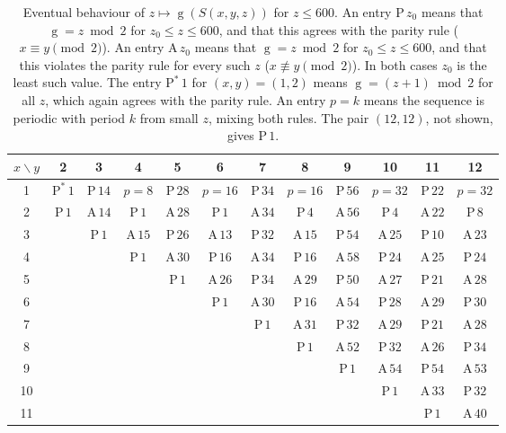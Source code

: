 \documentclass[11pt]{amsart}
\theoremstyle{definition}
\theoremstyle{remark}
\newcommand{\gv}{\operatorname{g}}           %
\newcommand{\Sp}{S}
\begin{document}
\begin{table}[t]
\centering
\footnotesize
\setlength{\tabcolsep}{3.2pt}
\begin{tabular}{c|ccccccccccc}
\toprule
$x\backslash y$ & 2 & 3 & 4 & 5 & 6 & 7 & 8 & 9 & 10 & 11 & 12\\
\midrule
1 & $\mathrm{P}^{*}\,1$ & $\mathrm{P}\,14$ & $p{=}8$ & $\mathrm{P}\,28$ & $p{=}16$ & $\mathrm{P}\,34$ & $p{=}16$ & $\mathrm{P}\,56$ & $p{=}32$ & $\mathrm{P}\,22$ & $p{=}32$\\
2 & $\mathrm{P}\,1$ & $\mathrm{A}\,14$ & $\mathrm{P}\,1$ & $\mathrm{A}\,28$ & $\mathrm{P}\,1$ & $\mathrm{A}\,34$ & $\mathrm{P}\,4$ & $\mathrm{A}\,56$ & $\mathrm{P}\,4$ & $\mathrm{A}\,22$ & $\mathrm{P}\,8$\\
3 &  & $\mathrm{P}\,1$ & $\mathrm{A}\,15$ & $\mathrm{P}\,26$ & $\mathrm{A}\,13$ & $\mathrm{P}\,32$ & $\mathrm{A}\,15$ & $\mathrm{P}\,54$ & $\mathrm{A}\,25$ & $\mathrm{P}\,10$ & $\mathrm{A}\,23$\\
4 &  &  & $\mathrm{P}\,1$ & $\mathrm{A}\,30$ & $\mathrm{P}\,16$ & $\mathrm{A}\,34$ & $\mathrm{P}\,16$ & $\mathrm{A}\,58$ & $\mathrm{P}\,24$ & $\mathrm{A}\,25$ & $\mathrm{P}\,24$\\
5 &  &  &  & $\mathrm{P}\,1$ & $\mathrm{A}\,26$ & $\mathrm{P}\,34$ & $\mathrm{A}\,29$ & $\mathrm{P}\,50$ & $\mathrm{A}\,27$ & $\mathrm{P}\,21$ & $\mathrm{A}\,28$\\
6 &  &  &  &  & $\mathrm{P}\,1$ & $\mathrm{A}\,30$ & $\mathrm{P}\,16$ & $\mathrm{A}\,54$ & $\mathrm{P}\,28$ & $\mathrm{A}\,29$ & $\mathrm{P}\,30$\\
7 &  &  &  &  &  & $\mathrm{P}\,1$ & $\mathrm{A}\,31$ & $\mathrm{P}\,32$ & $\mathrm{A}\,29$ & $\mathrm{P}\,21$ & $\mathrm{A}\,28$\\
8 &  &  &  &  &  &  & $\mathrm{P}\,1$ & $\mathrm{A}\,52$ & $\mathrm{P}\,32$ & $\mathrm{A}\,26$ & $\mathrm{P}\,34$\\
9 &  &  &  &  &  &  &  & $\mathrm{P}\,1$ & $\mathrm{A}\,54$ & $\mathrm{P}\,54$ & $\mathrm{A}\,53$\\
10 &  &  &  &  &  &  &  &  & $\mathrm{P}\,1$ & $\mathrm{A}\,33$ & $\mathrm{P}\,32$\\
11 &  &  &  &  &  &  &  &  &  & $\mathrm{P}\,1$ & $\mathrm{A}\,40$\\
\bottomrule
\end{tabular}
\caption{Eventual behaviour of $z\mapsto\gv(\Sp(x,y,z))$ for $z\le 600$. An entry $\mathrm{P}\,z_0$ means that $\gv=z\bmod 2$ for $z_0\le z\le 600$, and that this agrees with the parity rule ($x\equiv y\pmod 2$). An entry $\mathrm{A}\,z_0$ means that $\gv=z\bmod 2$ for $z_0\le z\le 600$, and that this violates the parity rule for every such $z$ ($x\not\equiv y\pmod 2$). In both cases $z_0$ is the least such value. The entry $\mathrm{P}^{*}\,1$ for $(x,y)=(1,2)$ means $\gv=(z+1)\bmod 2$ for all $z$, which again agrees with the parity rule. An entry $p{=}k$ means the sequence is periodic with period $k$ from small $z$, mixing both rules. The pair $(12,12)$, not shown, gives $\mathrm{P}\,1$.}
\label{tab:families}
\end{table}
\end{document}
